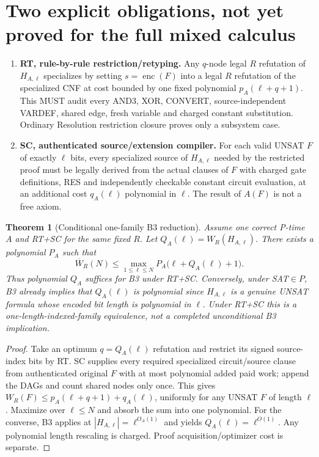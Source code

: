 \documentclass[11pt]{article}
\newtheorem{theorem}{Theorem}
\begin{document}
\section*{Two explicit obligations, not yet proved for the full mixed calculus}
\begin{enumerate}
\item[] \textbf{RT, rule-by-rule restriction/retyping.} Any $q$-node legal $R$ refutation of $H_{A,\ell}$ specializes by setting $s=\operatorname{enc}(F)$ into a legal $R$ refutation of the specialized CNF at cost bounded by one fixed polynomial $p_A(\ell+q+1)$. This MUST audit every AND3, XOR, CONVERT, source-independent VARDEF, shared edge, fresh variable and charged constant substitution. Ordinary Resolution restriction closure proves only a subsystem case.
\item[] \textbf{SC, authenticated source/extension compiler.} For each valid UNSAT $F$ of exactly $\ell$ bits, every specialized source of $H_{A,\ell}$ needed by the restricted proof must be legally derived from the actual clauses of $F$ with charged gate definitions, RES and independently checkable constant circuit evaluation, at an additional cost $q_A(\ell)$ polynomial in $\ell$. The result of $A(F)$ is not a free axiom.
\end{enumerate}
\begin{theorem}[Conditional one-family B3 reduction]
Assume one correct P-time $A$ and RT+SC for the \emph{same fixed} $R$. Let $Q_A(\ell)=W_R(H_{A,\ell})$. There exists a polynomial $P_A$ such that
\[
\boxed{\overline W_R(N)\le\max_{1\le\ell\le N}
 P_A\bigl(\ell+Q_A(\ell)+1\bigr).}\tag{2}
\]
Thus polynomial $Q_A$ suffices for B3 under RT+SC. Conversely, under SAT$\in P$, B3 already implies that $Q_A(\ell)$ is polynomial since $H_{A,\ell}$ is a genuine UNSAT formula whose encoded bit length is polynomial in $\ell$. Under RT+SC this is a \emph{one-length-indexed-family equivalence}, not a completed unconditional B3 implication.
\end{theorem}
\begin{proof}
Take an optimum $q=Q_A(\ell)$ refutation and restrict its signed source-index bits by RT. SC supplies every required specialized circuit/source clause from authenticated original $F$ with at most polynomial added paid work; append the DAGs and count shared nodes only once. This gives $W_R(F)\le p_A(\ell+q+1)+q_A(\ell)$, uniformly for any UNSAT $F$ of length $\ell$. Maximize over $\ell\le N$ and absorb the sum into one polynomial. For the converse, B3 applies at $|H_{A,\ell}|=\ell^{O_A(1)}$ and yields $Q_A(\ell)=\ell^{O(1)}$. Any polynomial length rescaling is charged. Proof acquisition/optimizer cost is separate.
\end{proof}
\end{document}
